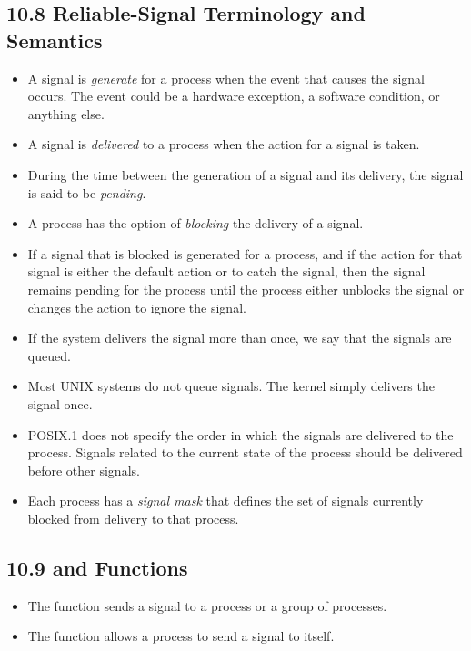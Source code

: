 \documentclass[]{article}
\begin{document}
\subsection*{10.8 Reliable-Signal Terminology and Semantics}
\begin{itemize}
\item A signal is \emph{generate} for a process when the event that causes the
signal occurs. The event could be a hardware exception, a software condition, or
anything else.
\item A signal is \emph{delivered} to a process when the action for a signal is
taken.
\item During the time between the generation of a signal and its delivery, the
signal is said to be \emph{pending}.
\item A process has the option of \emph{blocking} the delivery of a signal.
\item If a signal that is blocked is generated for a process, and if the action
for that signal is either the default action or to catch the signal, then the
signal remains pending for the process until the process either unblocks the
signal or changes the action to ignore the signal.
\item If the system delivers the signal more than once, we say that the signals
are queued.
\item Most UNIX systems do not queue signals. The kernel simply delivers the
signal once.
\item POSIX.1 does not specify the order in which the signals are delivered to
the process. Signals related to the current state of the process should be
delivered before other signals.
\item Each process has a \emph{signal mask} that defines the set of signals
currently blocked from delivery to that process.
\end{itemize}

\subsection{10.9  and  Functions}
\begin{itemize}
\item The  function sends a signal to a process or a group of
processes.
\item The  function allows a process to send a signal to itself.
\end{itemize}

\end{document}
